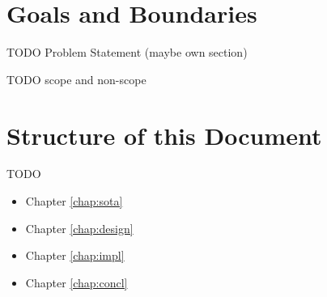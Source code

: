 \section{Goals and Boundaries}

TODO Problem Statement (maybe own section)

TODO scope and non-scope

\section{Structure of this Document}

TODO

\begin{itemize}
    \item Chapter \ref{chap:sota}
    \item Chapter \ref{chap:design}
    \item Chapter \ref{chap:impl}
    \item Chapter \ref{chap:concl}
\end{itemize}